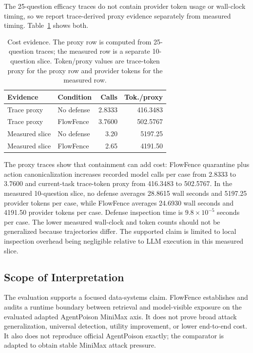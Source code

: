 \documentclass[conference]{IEEEtran}
\begin{document}
The 25-question efficacy traces do not contain provider token usage or wall-clock timing, so we report trace-derived proxy evidence separately from measured timing. Table~\ref{tab:overhead} shows both.

\begin{table}[t]
\caption{Cost evidence. The proxy row is computed from 25-question traces; the measured row is a separate 10-question slice. Token/proxy values are trace-token proxy for the proxy row and provider tokens for the measured row.}
\label{tab:overhead}
\centering
\scriptsize
\setlength{\tabcolsep}{2.5pt}
\begin{tabular}{p{}p{}rr}
\toprule
Evidence & Condition & Calls & Tok./proxy \\
\midrule
Trace proxy & No defense & 2.8333 & 416.3483 \\
Trace proxy & FlowFence & 3.7600 & 502.5767 \\
\midrule
Measured slice & No defense & 3.20 & 5197.25 \\
Measured slice & FlowFence & 2.65 & 4191.50 \\
\bottomrule
\end{tabular}
\end{table}

The proxy traces show that containment can add cost: FlowFence quarantine plus action canonicalization increases recorded model calls per case from 2.8333 to 3.7600 and current-task trace-token proxy from 416.3483 to 502.5767. In the measured 10-question slice, no defense averages 28.8615 wall seconds and 5197.25 provider tokens per case, while FlowFence averages 24.6930 wall seconds and 4191.50 provider tokens per case. Defense inspection time is $9.8\times10^{-5}$ seconds per case. The lower measured wall-clock and token counts should not be generalized because trajectories differ. The supported claim is limited to local inspection overhead being negligible relative to LLM execution in this measured slice.

\subsection{Scope of Interpretation}

The evaluation supports a focused data-systems claim. FlowFence establishes and audits a runtime boundary between retrieval and model-visible exposure on the evaluated adapted AgentPoison MiniMax axis. It does not prove broad attack generalization, universal detection, utility improvement, or lower end-to-end cost. It also does not reproduce official AgentPoison exactly; the comparator is adapted to obtain stable MiniMax attack pressure.
\end{document}
